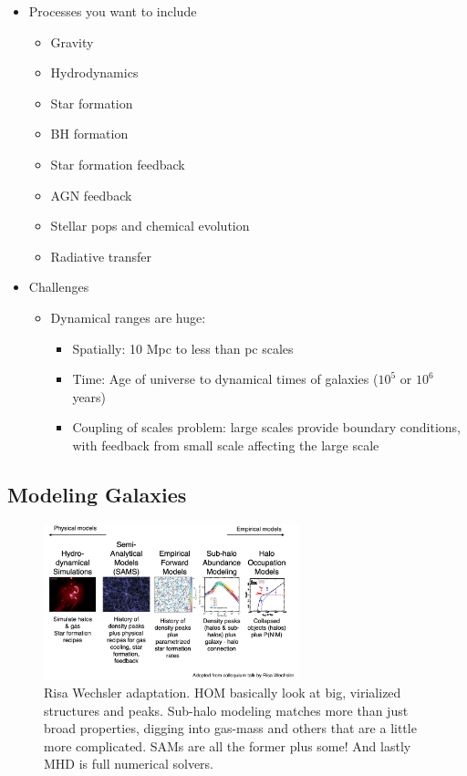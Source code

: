 \documentclass{article}
\begin{document}
\begin{itemize}
    \item Processes you want to include
    \begin{itemize}
        \item Gravity
        \item Hydrodynamics
        \item Star formation
        \item BH formation
        \item Star formation feedback
        \item AGN feedback
        \item Stellar pops and chemical evolution
        \item Radiative transfer
    \end{itemize}
    
    \item Challenges
    \begin{itemize}
        \item Dynamical ranges are huge:
        \begin{itemize}
            \item Spatially: 10 Mpc to less than pc scales
            \item Time: Age of universe to dynamical times of galaxies ($10^{5}$ or $10^{6}$ years)
            \item Coupling of scales problem: large scales provide boundary conditions, with feedback from small scale affecting the large scale
        \end{itemize}
    \end{itemize}
\end{itemize}

\subsection{Modeling Galaxies}

\begin{figure}
    \centering
    \includegraphics[width=0.66\textwidth]{figs/Screen Shot 2021-11-17 at 10.10.31 AM.png}
    \caption{Risa Wechsler adaptation. HOM basically look at big, virialized structures and peaks. Sub-halo modeling matches more than just broad properties, digging into gas-mass and others that are a little more complicated. SAMs are all the former plus some! And lastly MHD is full numerical solvers. }
    \label{fig:rw_adap}
\end{figure}
\end{document}
